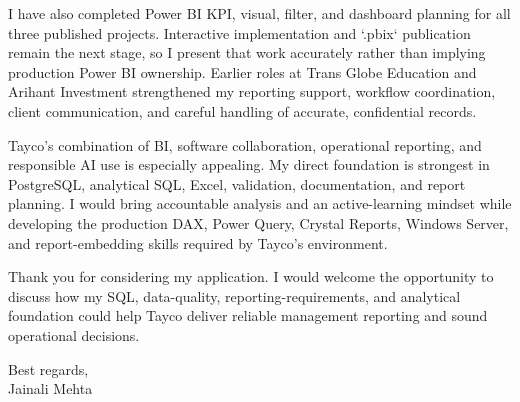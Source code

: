 \documentclass[letterpaper,11pt]{article}
\begin{document}
\bigbreak
I have also completed Power BI KPI, visual, filter, and dashboard planning for all three published projects. Interactive implementation and `.pbix` publication remain the next stage, so I present that work accurately rather than implying production Power BI ownership. Earlier roles at Trans Globe Education and Arihant Investment strengthened my reporting support, workflow coordination, client communication, and careful handling of accurate, confidential records.

\bigbreak
Tayco's combination of BI, software collaboration, operational reporting, and responsible AI use is especially appealing. My direct foundation is strongest in PostgreSQL, analytical SQL, Excel, validation, documentation, and report planning. I would bring accountable analysis and an active-learning mindset while developing the production DAX, Power Query, Crystal Reports, Windows Server, and report-embedding skills required by Tayco's environment.

\bigbreak
Thank you for considering my application. I would welcome the opportunity to discuss how my SQL, data-quality, reporting-requirements, and analytical foundation could help Tayco deliver reliable management reporting and sound operational decisions.

\bigbreak
Best regards,\\
Jainali Mehta
\end{document}
